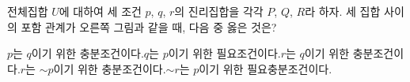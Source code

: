 \noindent\begin{minipage}[t]{0.58\linewidth}\vspace{0pt}\raggedright 전체집합 $U$에 대하여 세 조건 $p$, $q$, $r$의 진리집합을 각각 $P$, $Q$, $R$라 하자. 세 집합 사이의 포함 관계가 오른쪽 그림과 같을 때, 다음 중 옳은 것은?\end{minipage}\hfill\begin{minipage}[t]{0.4\linewidth}\vspace{0pt}\centering \resizebox{\ifdim\width>\linewidth\linewidth\else\width\fi}{!}{}\end{minipage}\par
\begin{choicesv}{$p$는 $q$이기 위한 충분조건이다.}{$q$는 $p$이기 위한 필요조건이다.}{$r$는 $q$이기 위한 충분조건이다.}{$r$는 $\sim p$이기 위한 충분조건이다.}{$\sim r$는 $p$이기 위한 필요충분조건이다.}\end{choicesv}
